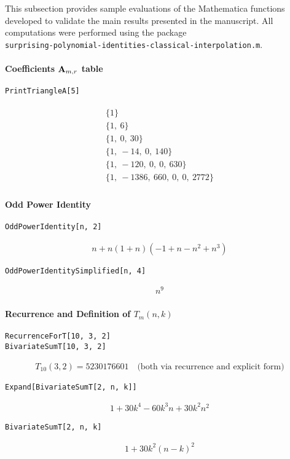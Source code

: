 This subsection provides sample evaluations of the Mathematica functions
developed to validate the main results presented in the manuscript.
All computations were performed using the package \\
\texttt{surprising-polynomial-identities-classical-interpolation.m}.

\paragraph{Coefficients \texorpdfstring{${\mathbf{A}} \sb{m,r}$}{A(m,r)} table}
\begin{verbatim}
PrintTriangleA[5]
\end{verbatim}
\begin{align*}
    \begin{array}{l}
        \{1\} \\
        \{1,\ 6\} \\
        \{1,\ 0,\ 30\} \\
        \{1,\ -14,\ 0,\ 140\} \\
        \{1,\ -120,\ 0,\ 0,\ 630\} \\
        \{1,\ -1386,\ 660,\ 0,\ 0,\ 2772\}
    \end{array}
\end{align*}

\paragraph{Odd Power Identity}
\begin{verbatim}
OddPowerIdentity[n, 2]
\end{verbatim}
\begin{align*}
    n + n(1 + n)(-1 + n - n^2 + n^3)
\end{align*}
\begin{verbatim}
OddPowerIdentitySimplified[n, 4]
\end{verbatim}
\begin{align*}
    n^9
\end{align*}

\paragraph{Recurrence and Definition of \texorpdfstring{$T_m(n,k)$}{Tm(n,k)}}
\begin{verbatim}
RecurrenceForT[10, 3, 2]
BivariateSumT[10, 3, 2]
\end{verbatim}
\begin{align*}
    T_{10}(3,2) = 5230176601 \quad \text{(both via recurrence and explicit form)}
\end{align*}
\begin{verbatim}
Expand[BivariateSumT[2, n, k]]
\end{verbatim}
\begin{align*}
    1 + 30k^4 - 60k^3 n + 30k^2 n^2
\end{align*}
\begin{verbatim}
BivariateSumT[2, n, k]
\end{verbatim}
\begin{align*}
    1 + 30k^2(n-k)^2
\end{align*}

